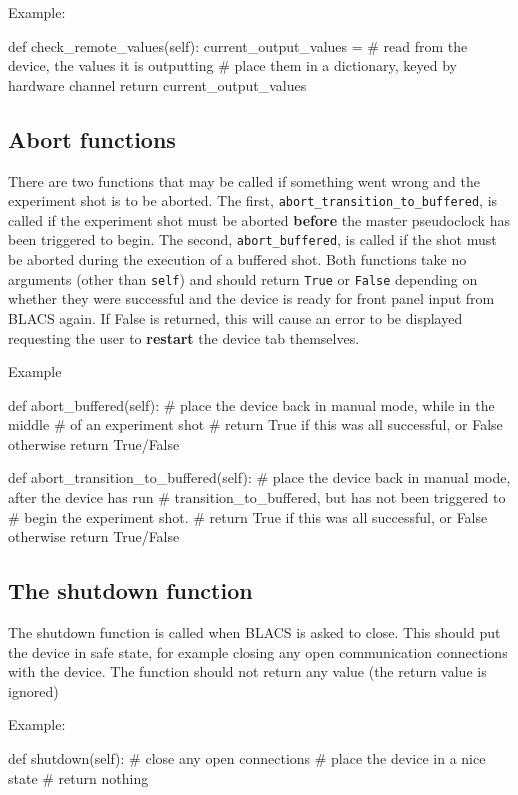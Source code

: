 \documentclass[12pt]{article}
\begin{document}
Example:
\begin{python}
    def check_remote_values(self):
        current_output_values = {}
        # read from the device, the values it is outputting
        # place them in a dictionary, keyed by hardware channel
        return current_output_values
\end{python}


\subsection{Abort functions}
There are two functions that may be called if something went wrong and the experiment shot is to be aborted.
The first, \texttt{abort\_transition\_to\_buffered}, is called if the experiment shot must be aborted \textbf{before} the master pseudoclock has been triggered to begin.
The second, \texttt{abort\_buffered}, is called if the shot must be aborted during the execution of a buffered shot.
Both functions take no arguments (other than \texttt{self}) and should return \texttt{True} or \texttt{False} depending on whether they were successful and the device is ready for front panel input from BLACS again.
If False is returned, this will cause an error to be displayed requesting the user to \textbf{restart} the device tab themselves. 

Example
\begin{python}
    def abort_buffered(self):
        # place the device back in manual mode, while in the middle
        #       of an experiment shot
        # return True if this was all successful, or False otherwise
        return True/False
		
    def abort_transition_to_buffered(self):
        # place the device back in manual mode, after the device has run
        #       transition_to_buffered, but has not been triggered to 
        #       begin the experiment shot.
        # return True if this was all successful, or False otherwise
        return True/False		
\end{python}


\subsection{The shutdown function}
The shutdown function is called when BLACS is asked to close.
This should put the device in safe state, for example closing any open communication connections with the device.
The function should not return any value (the return value is ignored)

Example:
\begin{python}
    def shutdown(self):
        # close any open connections
        # place the device in a nice state
        # return nothing
\end{python}
\end{document}
